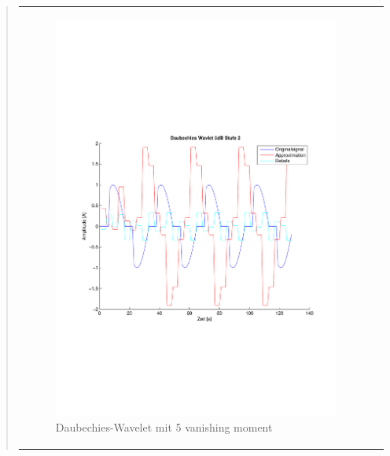 \begin{quote}
\begin{center}
\begin{tabular}{ll}
\begin{minipage}{0.6\textwidth}
                        \begin{figure}[H]
                            \label{fig:}
                            \includegraphics[scale=0.45, trim = 0.8cm 6cm 3cm
                            7.5cm,
                            clip]{./Bilder/Termin8/Daubechies_Wavlet_5db_lvl_2}
                            \caption{Daubechies-Wavelet mit 5 vanishing moment}
                        \end{figure}
                    \vspace{-1.5em}
    
                    \end{minipage}
    
                \end{tabular}
                \end{center}
                

\end{quote}
